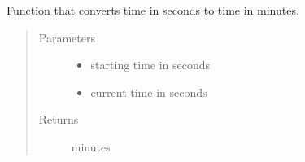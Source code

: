 \documentclass[letterpaper,10pt,english]{sphinxmanual}
\begin{document}
\begin{fulllineitems}
\label{\detokenize{index:utils.s_to_m}}
Function that converts time in seconds to time in minutes.
\begin{quote}\begin{description}
\item[{Parameters}] \leavevmode\begin{itemize}
\item {} 
 \textendash{} starting time in seconds

\item {} 
 \textendash{} current time in seconds

\end{itemize}

\item[{Returns}] \leavevmode
minutes

\end{description}\end{quote}

\end{fulllineitems}

\label{\detokenize{index:module-hyperband.hyperband_finite}}
\end{document}
